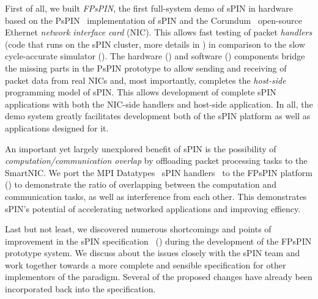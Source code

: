 First of all, we built \emph{FPsPIN}, the first full-system demo of sPIN in hardware based on the PsPIN~\cite{di_girolamo_pspin_2021} implementation of sPIN and the Corundum~\cite{forencich_corundum_2020} open-source Ethernet \emph{network interface card} (NIC).  This allows fast testing of packet \emph{handlers} (code that runs on the sPIN cluster, more details in ) in comparison to the slow cycle-accurate simulator ().  The hardware () and software () components bridge the missing parts in the PsPIN prototype to allow sending and receiving of packet data from real NICs and, most importantly, completes the \emph{host-side} programming model of sPIN.  This allows development of complete sPIN applications with both the NIC-side handlers and host-side application.  In all, the demo system greatly facilitates development both of the sPIN platform as well as applications designed for it.

An important yet largely unexplored benefit of sPIN is the possibility of \emph{computation/communication overlap} by offloading packet processing tasks to the SmartNIC.  We port the MPI Datatypes~\cite{ropo_processing_2009} sPIN handlers~\cite{di_girolamo_network-accelerated_2019} to the FPsPIN platform () to demonstrate the ratio of overlapping between the computation and communication tasks, as well as interference from each other.  This demonstrates sPIN's potential of accelerating networked applications and improving effiency.

Last but not least, we discovered numerous shortcomings and points of improvement in the sPIN specification~\cite{hoefler_spin_2017} () during the development of the FPsPIN prototype system.  We discuss about the issues closely with the sPIN team and work together towards a more complete and sensible specification for other implementors of the paradigm.  Several of the proposed changes have already been incorporated back into the specification.